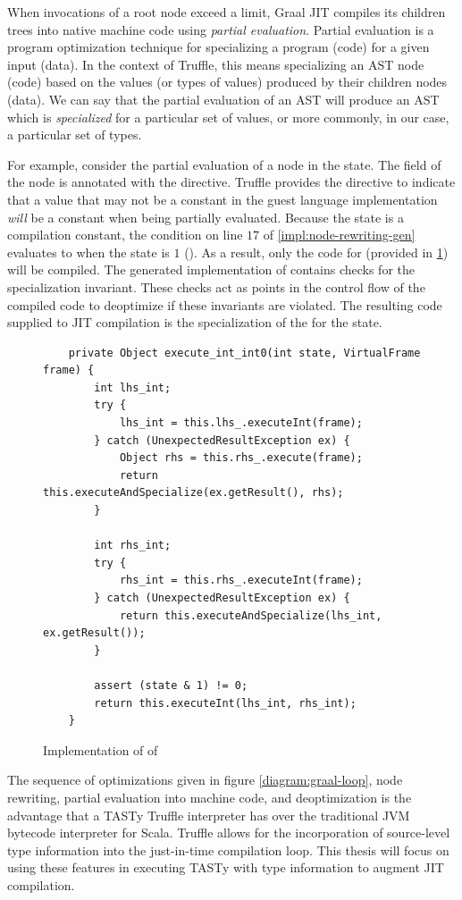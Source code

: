 When invocations of a root node exceed a limit, Graal JIT compiles its children trees into native machine code using \textit{partial evaluation}.
Partial evaluation is a program optimization technique for specializing a program (code) for a given input (data)\cite{futamura:partial-eval}.
In the context of Truffle, this means specializing an AST node (code) based on the values (or types of values) produced by their children nodes (data)\cite{truffle:partial-eval}.
We can say that the partial evaluation of an AST  will produce an AST which is \textit{specialized} for a particular set of values, or more commonly, in our case, a particular set of types.

For example, consider the partial evaluation of a  node in the  state.
The  field of the node is annotated with the  directive.
Truffle provides the  directive to indicate that a value that may not be a constant in the guest language implementation \textit{will} be a constant when being partially evaluated.
Because the state is a compilation constant, the condition on line $17$ of \ref{impl:node-rewriting-gen} evaluates to  when the state is $1$ ().
As a result, only the code for  (provided in \ref{impl:node-rewriting-state2}) will be compiled.
The generated implementation of  contains checks for the specialization invariant.
These checks act as points in the control flow of the compiled code to deoptimize if these invariants are violated.
The resulting code supplied to JIT compilation is the specialization of the  for the  state.

\begin{figure}[!htb]
	\begin{verbatim}
    private Object execute_int_int0(int state, VirtualFrame frame) {
		int lhs_int;
		try {
			lhs_int = this.lhs_.executeInt(frame);
		} catch (UnexpectedResultException ex) {
			Object rhs = this.rhs_.execute(frame);
			return this.executeAndSpecialize(ex.getResult(), rhs);
		}
		
		int rhs_int;
		try {
			rhs_int = this.rhs_.executeInt(frame);
		} catch (UnexpectedResultException ex) {
			return this.executeAndSpecialize(lhs_int, ex.getResult());
		}
		
		assert (state & 1) != 0;
		return this.executeInt(lhs_int, rhs_int);
	}
	\end{verbatim}
	\caption{Implementation of  of }
	\label{impl:node-rewriting-state2}
\end{figure}

The sequence of optimizations given in figure \ref{diagram:graal-loop}, node rewriting, partial evaluation into machine code, and deoptimization is the advantage that a TASTy Truffle interpreter has over the traditional JVM bytecode interpreter for Scala.
Truffle allows for the incorporation of source-level type information into the just-in-time compilation loop.
This thesis will focus on using these features in executing TASTy with type information to augment JIT compilation.

